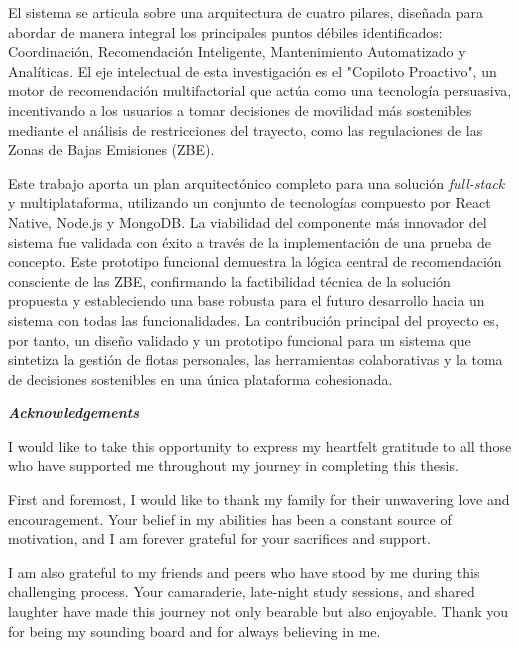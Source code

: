 \textgap

El sistema se articula sobre una arquitectura de cuatro pilares, diseñada para abordar de manera integral los principales puntos débiles identificados: Coordinación, Recomendación Inteligente, Mantenimiento Automatizado y Analíticas. El eje intelectual de esta investigación es el "Copiloto Proactivo", un motor de recomendación multifactorial que actúa como una tecnología persuasiva, incentivando a los usuarios a tomar decisiones de movilidad más sostenibles mediante el análisis de restricciones del trayecto, como las regulaciones de las Zonas de Bajas Emisiones (ZBE).

\textgap

Este trabajo aporta un plan arquitectónico completo para una solución \textit{full-stack} y multiplataforma, utilizando un conjunto de tecnologías compuesto por React Native, Node.js y MongoDB. La viabilidad del componente más innovador del sistema fue validada con éxito a través de la implementación de una prueba de concepto. Este prototipo funcional demuestra la lógica central de recomendación consciente de las ZBE, confirmando la factibilidad técnica de la solución propuesta y estableciendo una base robusta para el futuro desarrollo hacia un sistema con todas las funcionalidades. La contribución principal del proyecto es, por tanto, un diseño validado y un prototipo funcional para un sistema que sintetiza la gestión de flotas personales, las herramientas colaborativas y la toma de decisiones sostenibles en una única plataforma cohesionada.

\newpage


\begin{center}
    \large\bfseries \textit{Acknowledgements}
\end{center}

I would like to take this opportunity to express my heartfelt gratitude to all those who have supported me throughout my journey in completing this thesis.

\textgap

First and foremost, I would like to thank my family for their unwavering love and encouragement. Your belief in my abilities has been a constant source of motivation, and I am forever grateful for your sacrifices and support.

\textgap

I am also grateful to my friends and peers who have stood by me during this challenging process. Your camaraderie, late-night study sessions, and shared laughter have made this journey not only bearable but also enjoyable. Thank you for being my sounding board and for always believing in me.


